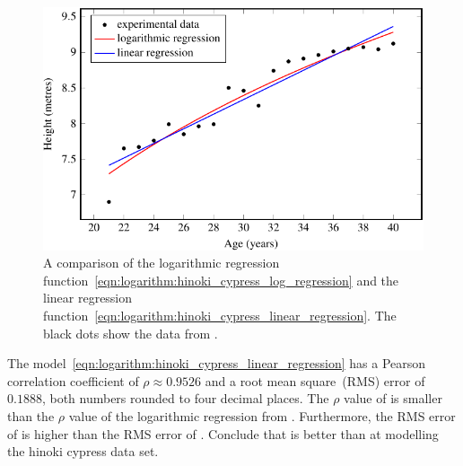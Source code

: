 \documentclass[a4paper,oneside,12pt]{article}
\begin{document}
{\begin{solution}
\begin{figure}[!htbp]
\centering
\includegraphics[scale=1.1]{image/12/hinoki-cypress-linear-log.pdf}
\caption{%
  A comparison of the logarithmic regression
  function~\eqref{eqn:logarithm:hinoki_cypress_log_regression} and the
  linear regression
  function~\eqref{eqn:logarithm:hinoki_cypress_linear_regression}.
  The black dots show the data from
  .
}
\label{fig:logarithm:hinoki_cypress_regression_comparison}
\end{figure}

The model~\eqref{eqn:logarithm:hinoki_cypress_linear_regression} has a
Pearson correlation coefficient of $\rho \approx 0.9526$ and a root
mean square~(RMS) error of $0.1888$, both numbers rounded to four
decimal places.  The $\rho$ value of
 is smaller
than the $\rho$ value of the logarithmic regression from
.  Furthermore, the RMS
error of  is
higher than the RMS error of
.  Conclude that
 is better than
 at modelling
the hinoki cypress data set.
\end{solution}
}{}

\begin{table}[!htbp]
\centering

\caption{%
  The mean diameter at breast height~(DBH) versus mean height of $35$
  species of trees in a selective logging forest.  The study site was
  called Sombo and the forest was located in the northern region of
  the Republic of Congo, Africa.  The DBH of a tree is usually
  measured at $1.3$ metres above ground level.  DBH is measured in
  centimetres and tree height is measured in metres.
}
\label{tab:logarithm:Sombo}
\end{table}
\end{document}
